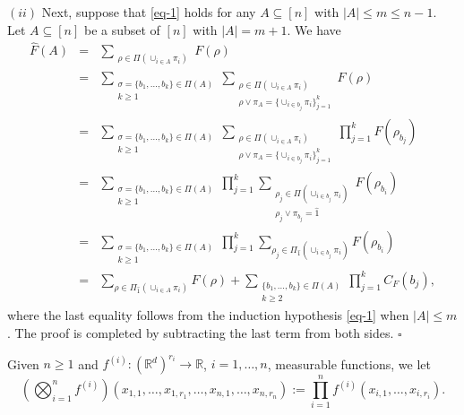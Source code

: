 \documentclass[12pt]{article}
\newcommand{\R}{\mathbb{R}}
\newenvironment{Proof}{\removelastskip\par\medskip
\noindent{\em Proof.} \rm}{\penalty-20\null\hfill$\square$\par\medbreak}
\numberwithin{equation}{section}
\begin{document}
\begin{Proof}
 \noindent
 $(ii)$ 
 Next, suppose that \eqref{eq-1} holds for any $A\subseteq[n]$ with $|A|\le m\le n-1$. Let $A\subseteq[n]$ be a subset of $[n]$ with $|A|=m+1$. We have 
\begin{eqnarray*}
  \widehat{F}(A)&=&
  \sum_{\substack{\rho\in\Pi(\cup_{i\in A}\pi_i)
    }
    }F(\rho)
  \\
  &=&%
  \sum_{\substack{\sigma=\{b_1,\dots,b_k\}\in\Pi(A)\\k\ge 1}}\sum_{\substack{\rho\in\Pi(\cup_{i\in A}\pi_i)\\
\rho\vee\pi_A=\{\cup_{i\in b_j}\pi_i\}_{j=1}^k}}F(\rho)\\
  &=&%
  \sum_{\substack{\sigma=\{b_1,\dots,b_k\}\in\Pi(A)\\k\ge 1}}\sum_{\substack{\rho\in\Pi(\cup_{i\in A}\pi_i)\\
\rho\vee\pi_A=\{\cup_{i\in b_j}\pi_i\}_{j=1}^k}}\prod_{j=1}^kF(\rho_{b_j})\\
  &=&%
  \sum_{\substack{\sigma=\{b_1,\dots,b_k\}\in\Pi(A)\\k\ge 1}}\prod_{j=1}^k
 \sum_{\substack{\rho_j\in\Pi(\cup_{i\in b_j}\pi_i)\\
     \rho_j\vee\pi_{b_j}=\widehat{1}}}F(\rho_{b_i})
 \\
 &=&%
 \sum_{\substack{\sigma=\{b_1,\dots,b_k\}\in\Pi(A)\\k\ge 1}}\prod_{j=1}^k
\sum_{\rho_j\in\Pi_{\widehat{1}}(\cup_{i\in b_j}\pi_i)}F(\rho_{b_i})
\\
&=& \sum_{\rho\in\Pi_{\widehat{1}}(\cup_{i\in A}\pi_i)}F(\rho)
+ \sum_{\substack{\{b_1,\dots,b_k\}\in\Pi(A)\\k\ge 2}}\prod_{j=1}^kC_F(b_j),
\end{eqnarray*}
where the last equality follows from the induction hypothesis \eqref{eq-1} when $|A|\le m$. The proof is completed by subtracting the last term from both sides.
\end{Proof}
Given $n\ge1$ and $f^{(i)}:(\R^d)^{r_i}\to\R$, $i=1,\dots,n$,
 measurable functions, we let 
$$
 \left(\bigotimes_{i=1}^nf^{(i)} \right)(x_{1,1},\ldots,x_{1,r_1},\ldots,
 x_{n,1},\ldots , x_{n,r_n}):=\prod_{i=1}^nf^{(i)} (x_{i,1},\dots,x_{i,r_i}). 
  $$
\end{document}
